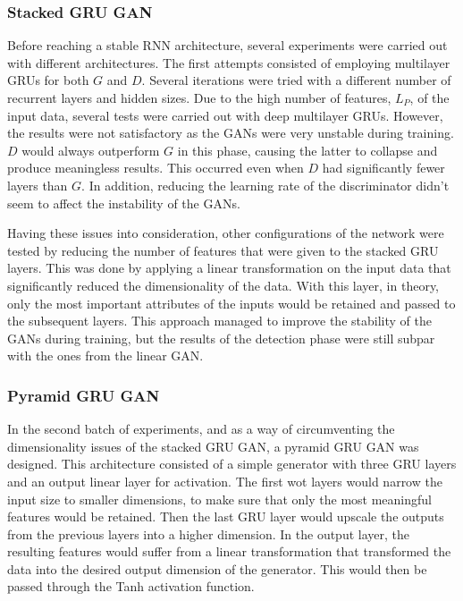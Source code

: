 \subsubsection*{Stacked GRU GAN}
Before reaching a stable RNN architecture, several experiments were carried out with different architectures. The first attempts consisted of employing multilayer GRUs for both $G$ and $D$. Several iterations were tried with a different number of recurrent layers and hidden sizes. Due to the high number of features, $L_P$, of the input data, several tests were carried out with deep multilayer GRUs. However, the results were not satisfactory as the GANs were very unstable during training. $D$ would always outperform $G$ in this phase, causing the latter to collapse and produce meaningless results. This occurred even when $D$ had significantly fewer layers than $G$. In addition, reducing the learning rate of the discriminator didn't seem to affect the instability of the GANs. 

Having these issues into consideration, other configurations of the network were tested by reducing the number of features that were given to the stacked GRU layers. This was done by applying a linear transformation on the input data that significantly reduced the dimensionality of the data. With this layer, in theory, only the most important attributes of the inputs would be retained and passed to the subsequent layers. This approach managed to improve the stability of the GANs during training, but the results of the detection phase were still subpar with the ones from the linear GAN.

\subsubsection*{Pyramid GRU GAN}
In the second batch of experiments, and as a way of circumventing the dimensionality issues of the stacked GRU GAN, a pyramid GRU GAN was designed. This architecture consisted of a simple generator with three GRU layers and an output linear layer for activation.
The first wot layers would narrow the input size to smaller dimensions, to make sure that only the most meaningful features would be retained. Then the last GRU layer would upscale the outputs from the previous layers into a higher dimension. In the output layer, the resulting features would suffer from a linear transformation that transformed the data into the desired output dimension of the generator. This would then be passed through the Tanh activation function.
    
